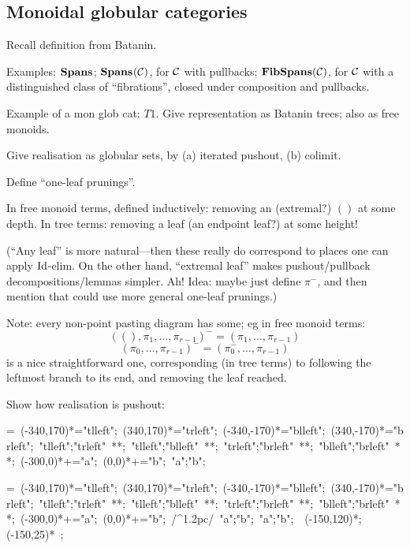 \subsection{Monoidal globular categories} Recall definition from Batanin. 

Examples: $\mathbf{Spans}_{}$; $\mathbf{Spans}_{}(\mathcal{C})$, for $\mathcal{C}$ with pullbacks; $\mathbf{FibSpans}(\mathcal{C})$, for $\mathcal{C}$ with a distinguished class of ``fibrations'', closed under composition and pullbacks.


Example of a mon glob cat: $T1$.  Give representation as Batanin trees; also as free monoids.

Give realisation as globular sets, by (a) iterated pushout, (b) colimit.

Define ``one-leaf prunings''.  

In free monoid terms, defined inductively: removing an (extremal?) $()$ at some depth.  In tree terms: removing a leaf (an endpoint leaf?) at some height!

(``Any leaf'' is more natural---then these really do correspond to places one can apply $\mathrm{Id}$-elim.  On the other hand, ``extremal leaf'' makes pushout/pullback decompositions/lemmas simpler.  Ah!  Idea: maybe just define $\pi^-$, and then mention that could use more general one-leaf prunings.)

Note: every non-point pasting diagram has some; eg in free monoid terms: 
$$((),\pi_1,\ldots,\pi_{r-1})^- = (\pi_1,\ldots,\pi_{r-1})$$
$$(\pi_0,\ldots,\pi_{r-1})^- = (\pi_0^-,\ldots,\pi_{r-1})$$
is a nice straightforward one, corresponding (in tree terms) to following the leftmost branch to its end, and removing the leaf reached.

Show how realisation is pushout:

\newbox\potlbox
\setbox\potlbox=\hbox{\xy 
(-340,170)*{}="tlleft"; %
(340,170)*{}="trleft";
(-340,-170)*{}="blleft";
(340,-170)*{}="brleft";
"tlleft";"trleft" **;
"tlleft";"blleft" **;
"trleft";"brleft" **;
"blleft";"brleft" **;
(-300,0)*+{\cdot}="a";
(0,0)*+{\cdot}="b";
{\ar "a";"b"};
\endxy}
\def\potl{\copy\potlbox}

\newbox\potrbox
\setbox\potrbox=\hbox{\xy 
(-340,170)*{}="tlleft"; %
(340,170)*{}="trleft";
(-340,-170)*{}="blleft";
(340,-170)*{}="brleft";
"tlleft";"trleft" **;
"tlleft";"blleft" **;
"trleft";"brleft" **;
"blleft";"brleft" **;
(-300,0)*+{\cdot}="a";
(0,0)*+{\cdot}="b";
{\ar@/^1.2pc/ "a";"b"};
{\ar "a";"b"};
{\ar@{=>} (-150,120)*{};(-150,25)*{}} ;
\endxy}
\def\potr{\copy\potrbox}

